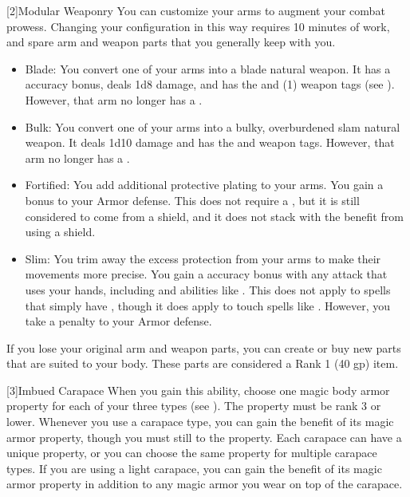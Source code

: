     [2]{Modular Weaponry} You can customize your arms to augment your combat prowess.
      Changing your configuration in this way requires 10 minutes of work, and spare arm and weapon parts that you generally keep with you.
      \begin{itemize}
        \item Blade: You convert one of your arms into a blade natural weapon.
          It has a  accuracy bonus, deals 1d8 damage, and has the  and  (1) weapon tags (see ).
          However, that arm no longer has a .
        \item Bulk: You convert one of your arms into a bulky, overburdened slam natural weapon.
          It deals 1d10 damage and has the  and  weapon tags.
          However, that arm no longer has a .
        \item Fortified: You add additional protective plating to your arms.
          You gain a  bonus to your Armor defense.
          This does not require a , but it is still considered to come from a shield, and it does not stack with the benefit from using a shield.
        \item Slim: You trim away the excess protection from your arms to make their movements more precise.
          You gain a  accuracy bonus with any attack that uses your hands, including  and abilities like .
          This does not apply to spells that simply have , though it does apply to touch spells like .
          However, you take a  penalty to your Armor defense.
      \end{itemize}

      If you lose your original arm and weapon parts, you can create or buy new parts that are suited to your body.
      These parts are considered a Rank 1 (40 gp) item.

      [3]{Imbued Carapace} When you gain this ability, choose one magic body armor property for each of your three  types (see ).
      The property must be rank 3 or lower.
      Whenever you use a carapace type, you can gain the benefit of its magic armor property, though you must still  to the property.
      Each carapace can have a unique property, or you can choose the same property for multiple carapace types.
      If you are using a light carapace, you can gain the benefit of its magic armor property in addition to any magic armor you wear on top of the carapace.

